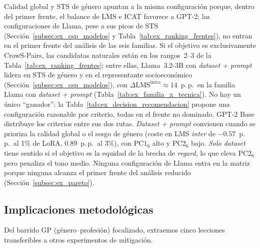 \documentclass[12pt,a4paper]{report}
\newcommand{\dLMSp}{\ensuremath{\Delta\mathrm{LMS}}}
\newcommand{\PConeSix}{\ensuremath{\mathrm{PC1}_6}}
\newcommand{\PCtwoSix}{\ensuremath{\mathrm{PC2}_6}}
\newcommand{\GP}{GP (género--profesión)}
\begin{document}
\noindent
Calidad global y STS de género apuntan a la misma configuración porque, dentro del primer frente, el balance de LMS e ICAT favorece a GPT-2; las configuraciones de Llama, pese a sus picos de STS (Sección~\ref{subsec:ex_csp_modelos} y Tabla~\ref{tab:ex_ranking_frentes}), no entran en el primer frente del análisis de las seis familias. Si el objetivo es exclusivamente CrowS-Pairs, las candidatas naturales están en los rangos~2--3 de la Tabla~\ref{tab:ex_ranking_frentes}; entre ellas, Llama~3.2-3B con \textit{dataset + prompt} lidera en STS de género y en el representante socioeconómico (Sección~\ref{subsec:ex_csp_modelos}), con $\dLMSp^{\mathrm{intra}}\approx 14$~p.\,p.\ en la familia Llama con \textit{dataset + prompt} (Tabla~\ref{tab:ex_familia_x_tecnica}). No hay un único ``ganador'': la Tabla~\ref{tab:ex_decision_recomendacion} propone una configuración razonable por criterio, todas en el frente no dominado. GPT-2 Base distribuye los criterios entre sus dos rutas. \textit{Dataset + prompt} convienen cuando se prioriza la calidad global o el sesgo de género (coste en LMS \textit{inter} de $-0.57$~p.\,p.\ al 1\% de LoRA, $0.89$~p.\,p.\ al 3\%), con \PConeSix{} alto y \PCtwoSix{} bajo. \textit{Solo dataset} tiene sentido si el objetivo es la equidad de la brecha de \textit{regard}, lo que eleva \PCtwoSix{} pero penaliza el tono medio. Ninguna configuración de Llama entra en la matriz porque ninguna alcanza el primer frente del análisis reducido (Sección~\ref{subsec:ex_pareto}).

\subsection{Implicaciones metodológicas}
\label{subsec:ex_implicaciones}

Del barrido \GP{} focalizado, extraemos cinco lecciones transferibles a otros experimentos de mitigación.
\end{document}
